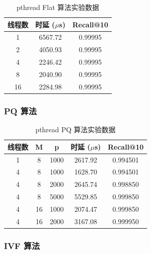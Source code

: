 \documentclass[a4paper]{article}
\begin{document}
\begin{table}[H]
\centering
\caption{pthread Flat 算法实验数据}
\begin{tabular}{ccc}
\toprule
线程数 & 时延 ($\mu$s) & Recall@10 \\
\midrule
1 & 6567.72 & 0.99995 \\
2 & 4050.93 & 0.99995 \\
4 & 2246.42 & 0.99995 \\
8 & 2040.90 & 0.99995 \\
16 & 2284.98 & 0.99995 \\
\bottomrule
\end{tabular}
\end{table}

\subsubsection{PQ 算法}

\begin{table}[H]
\centering
\caption{pthread PQ 算法实验数据}
\begin{tabular}{ccccc}
\toprule
线程数 & M & p & 时延 ($\mu$s) & Recall@10 \\
\midrule
1 & 8 & 1000 & 2617.92 & 0.994501 \\
4 & 8 & 1000 & 1628.70 & 0.994501 \\
4 & 8 & 2000 & 2645.74 & 0.998850 \\
4 & 8 & 5000 & 5529.85 & 0.999850 \\
4 & 16 & 1000 & 2074.47 & 0.999850 \\
4 & 16 & 2000 & 3167.08 & 0.999950 \\
\bottomrule
\end{tabular}
\end{table}

\subsubsection{IVF 算法}
\end{document}
